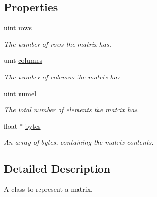\subsection*{Properties}
\begin{DoxyCompactItemize}
\item 
\hypertarget{interface_r_r_matrix2_d_ae54ee4fa664a1ad29afea6a9f691509f}{uint \hyperlink{interface_r_r_matrix2_d_ae54ee4fa664a1ad29afea6a9f691509f}{rows}}\label{interface_r_r_matrix2_d_ae54ee4fa664a1ad29afea6a9f691509f}

\begin{DoxyCompactList}\small\item\em The number of rows the matrix has. \end{DoxyCompactList}\item 
\hypertarget{interface_r_r_matrix2_d_af2ce736f85fec6263867d793597678f2}{uint \hyperlink{interface_r_r_matrix2_d_af2ce736f85fec6263867d793597678f2}{columns}}\label{interface_r_r_matrix2_d_af2ce736f85fec6263867d793597678f2}

\begin{DoxyCompactList}\small\item\em The number of columns the matrix has. \end{DoxyCompactList}\item 
\hypertarget{interface_r_r_matrix2_d_ab61474b7d341bf1bb3dfa08c977fe1c6}{uint \hyperlink{interface_r_r_matrix2_d_ab61474b7d341bf1bb3dfa08c977fe1c6}{numel}}\label{interface_r_r_matrix2_d_ab61474b7d341bf1bb3dfa08c977fe1c6}

\begin{DoxyCompactList}\small\item\em The total number of elements the matrix has. \end{DoxyCompactList}\item 
\hypertarget{interface_r_r_matrix2_d_ae20d9744dec88b7a5bd7cb76a3718584}{float $\ast$ \hyperlink{interface_r_r_matrix2_d_ae20d9744dec88b7a5bd7cb76a3718584}{bytes}}\label{interface_r_r_matrix2_d_ae20d9744dec88b7a5bd7cb76a3718584}

\begin{DoxyCompactList}\small\item\em An array of bytes, containing the matrix contents. \end{DoxyCompactList}\end{DoxyCompactItemize}


\subsection{Detailed Description}
A class to represent a matrix. 

